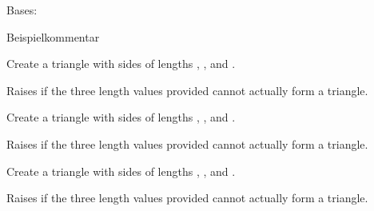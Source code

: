 \documentclass[letterpaper,12pt,english]{sphinxmanual}
\begin{document}
\begin{fulllineitems}
\label{\detokenize{Simulation:Simulation.NetToComp.NetToComp}}
Bases: 

Beispielkommentar

\begin{fulllineitems}
\label{\detokenize{Simulation:Simulation.NetToComp.NetToComp.getCommentsFromNetlist}}
Create a triangle with sides of lengths , , and .

Raises  if the three length values provided cannot
actually form a triangle.

\end{fulllineitems}


\begin{fulllineitems}
\label{\detokenize{Simulation:Simulation.NetToComp.NetToComp.getComponents}}
Create a triangle with sides of lengths , , and .

Raises  if the three length values provided cannot
actually form a triangle.

\end{fulllineitems}


\begin{fulllineitems}
\label{\detokenize{Simulation:Simulation.NetToComp.NetToComp.parseCommentsToArgs}}
\end{fulllineitems}


\begin{fulllineitems}
\label{\detokenize{Simulation:Simulation.NetToComp.NetToComp.stringArrToDict}}
Create a triangle with sides of lengths , , and .

Raises  if the three length values provided cannot
actually form a triangle.

\end{fulllineitems}


\end{fulllineitems}
\end{document}
